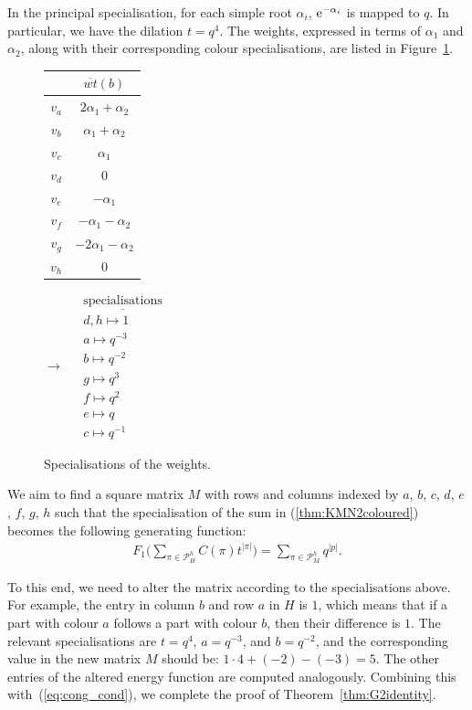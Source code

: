 \documentclass[10pt,a4paper]{amsart}
\numberwithin{equation}{section}
\theoremstyle{definition}
\begin{document}
In the principal specialisation, for each simple root $\alpha_i$, ${\rm e}^{-\alpha_i}$ is mapped to $q$. In particular, we have the dilation $t = q^4$. The weights, expressed in terms of $\alpha_1$ and $\alpha_2$, along with their corresponding colour specialisations, are listed in Figure~\ref{fig:specialisations}.
\begin{figure}[!t]
\centering
 \begin{tabular}{|c|c|}
 \hline
 & $\overline{wt}(b)$ \\
 \hline
 $v_a$ & $ 2\alpha_1+\alpha_2$ \\
 $v_b$ & $ \alpha_1+\alpha_2$ \\
 $v_c$ & $\alpha_1$ \\
 $v_d$ & $0$ \\
 $v_e$ & $-\alpha_1$ \\
 $v_f$ & $-\alpha_1-\alpha_2$ \\
 $v_g$ & $-2\alpha_1-\alpha_2$ \\
 $v_h$ & $0$ \\
 \hline
 \end{tabular}
 \qquad
 {$\longrightarrow$}
 \qquad
 $ \begin{aligned}
 &\underline{\text{specialisations}}
 \\
 &d, h \mapsto 1 \\
 &a \mapsto q^{-3} \\
 &b \mapsto q^{-2} \\
 &g \mapsto q^3 \\
 &f \mapsto q^2 \\
 &e \mapsto q \\
 &c \mapsto q^{-1}
 \end{aligned}$

 \caption{Specialisations of the weights.}
\label{fig:specialisations}
\end{figure}

We aim to find a square matrix $M$ with rows and columns indexed by $a$, $b$, $c$, $d$, $e$, $f$, $g$, $h$ such that the specialisation of the sum in (\ref{thm:KMN2coloured}) becomes the following generating function:
\begin{align*}
F_1\biggl(\sum_{\pi \in \mathcal{P}_{H}^h} C(\pi) t^{|\pi|}\biggr) = \sum_{\pi \in \mathcal{P}_{M}^h}q^{|p|}.
\end{align*}

To this end, we need to alter the matrix according to the specialisations above. For example, the entry in column $b$ and row $a$ in $H$ is $1$, which means that if a part with colour $a$ follows a part with colour $b$, then their difference is $1$. The relevant specialisations are $t = q^4$, $a = q^{-3}$, and $b = q^{-2}$, and the corresponding value in the new matrix $M$ should be: $1 \cdot 4 + (-2) - (-3) = 5$. The other entries of the altered energy function are computed analogously. Combining this with~(\ref{eq:cong_cond}), we complete the proof of Theorem~\ref{thm:G2identity}.
\end{document}

